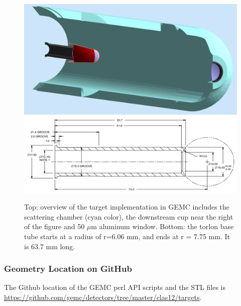 \begin{figure}
	\centering
	\includegraphics[width=0.95\columnwidth,keepaspectratio]{img/targetOverview1.png}
	\includegraphics[width=0.95\columnwidth,keepaspectratio]{img/targetOverview2.png}
	\caption{Top: overview of the target implementation in GEMC includes the scattering chamber (cyan color), the
            downstream cup near the right of the figure and 50 $\mu$m aluminum window. Bottom: the torlon base
            tube starts at a radius of r=6.06 mm, and ends at r = 7.75 mm. It is 63.7 mm long.}
	\label{fig:targetOverview}
\end{figure}

\subsubsection{Geometry Location on GitHub}
The Github location of the GEMC perl API scripts and the STL files is \url{https://github.com/gemc/detectors/tree/master/clas12/targets}.





